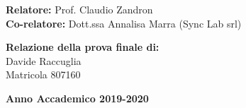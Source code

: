 \documentclass[a4paper,12pt,openright,twoside]{book}
\begin{document}
\begin{titlepage}
	\vspace{50mm}
	
	\noindent
	{\large \textbf{Relatore:} Prof. Claudio Zandron } \\
	
	\noindent
	{\large \textbf{Co-relatore:} Dott.ssa Annalisa Marra (Sync Lab srl)}
	
	\vspace{15mm}
	
	\begin{flushright}
		{\large \textbf{Relazione della prova finale di:}} \\
		\vspace{1mm}
		\large{Davide Raccuglia} \\
		\vspace{1mm}
		\large{Matricola 807160} 
	\end{flushright}
	
	\vspace{20mm}
	\begin{center}
		{\large{\bf Anno Accademico 2019-2020}}
	\end{center}
	
	\restoregeometry
	
\end{titlepage}




\cleardoublepage
\tableofcontents
\listoffigures{}



\backmatter

%
%
\end{document}

